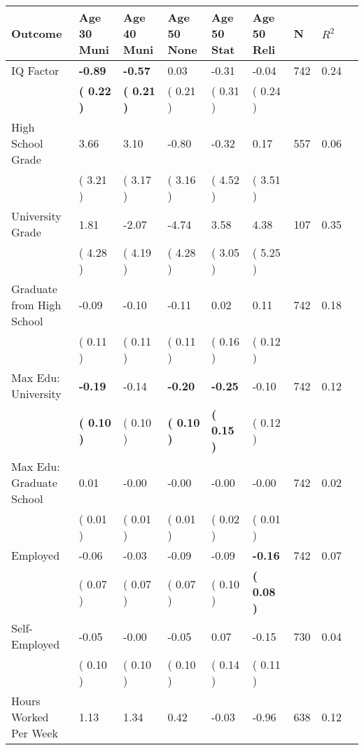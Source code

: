 \begin{tabular}{L{6.2cm} C{1.8cm} C{1.8cm} C{1.8cm} C{1.8cm} C{1.8cm} C{1.8cm} C{0.3cm} C{0.3cm}}
\toprule
 \textbf{Outcome} & \textbf{Age 30 Muni} & \textbf{Age 40 Muni} & \textbf{Age 50 None} & \textbf{Age 50 Stat} & \textbf{Age 50 Reli} & \textbf{N} & \textbf{$ R^2$} \\
\midrule
IQ Factor & \textbf{    -0.89} & \textbf{    -0.57} &      0.03 &     -0.31 &     -0.04  & 742 &       0.24 \\ 
 & \textbf{(     0.22 )} & \textbf{(     0.21 )} & (     0.21 ) & (     0.31 ) & (     0.24 )  & \\
High School Grade &      3.66 &      3.10 &     -0.80 &     -0.32 &      0.17  & 557 &       0.06 \\ 
 & (     3.21 ) & (     3.17 ) & (     3.16 ) & (     4.52 ) & (     3.51 )  & \\
University Grade &      1.81 &     -2.07 &     -4.74 &      3.58 &      4.38  & 107 &       0.35 \\ 
 & (     4.28 ) & (     4.19 ) & (     4.28 ) & (     3.05 ) & (     5.25 )  & \\
Graduate from High School &     -0.09 &     -0.10 &     -0.11 &      0.02 &      0.11  & 742 &       0.18 \\ 
 & (     0.11 ) & (     0.11 ) & (     0.11 ) & (     0.16 ) & (     0.12 )  & \\
Max Edu: University & \textbf{    -0.19} &     -0.14 & \textbf{    -0.20} & \textbf{    -0.25} &     -0.10  & 742 &       0.12 \\ 
 & \textbf{(     0.10 )} & (     0.10 ) & \textbf{(     0.10 )} & \textbf{(     0.15 )} & (     0.12 )  & \\
Max Edu: Graduate School &      0.01 &     -0.00 &     -0.00 &     -0.00 &     -0.00  & 742 &       0.02 \\ 
 & (     0.01 ) & (     0.01 ) & (     0.01 ) & (     0.02 ) & (     0.01 )  & \\
Employed &     -0.06 &     -0.03 &     -0.09 &     -0.09 & \textbf{    -0.16}  & 742 &       0.07 \\ 
 & (     0.07 ) & (     0.07 ) & (     0.07 ) & (     0.10 ) & \textbf{(     0.08 )}  & \\
Self-Employed &     -0.05 &     -0.00 &     -0.05 &      0.07 &     -0.15  & 730 &       0.04 \\ 
 & (     0.10 ) & (     0.10 ) & (     0.10 ) & (     0.14 ) & (     0.11 )  & \\
Hours Worked Per Week &      1.13 &      1.34 &      0.42 &     -0.03 &     -0.96  & 638 &       0.12 \\ 

\end{tabular}
